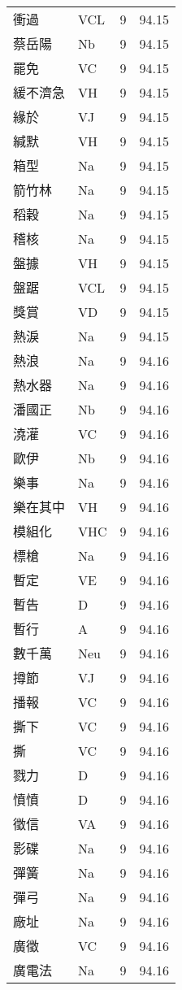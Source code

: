 \documentclass[twocolumn]{book}
\begin{document}
\begin{supertabular}{llrr}
衝過 & VCL & 9 &  94.15\\
蔡岳陽 & Nb & 9 &  94.15\\
罷免 & VC & 9 &  94.15\\
緩不濟急 & VH & 9 &  94.15\\
緣於 & VJ & 9 &  94.15\\
緘默 & VH & 9 &  94.15\\
箱型 & Na & 9 &  94.15\\
箭竹林 & Na & 9 &  94.15\\
稻穀 & Na & 9 &  94.15\\
稽核 & Na & 9 &  94.15\\
盤據 & VH & 9 &  94.15\\
盤踞 & VCL & 9 &  94.15\\
獎賞 & VD & 9 &  94.15\\
熱淚 & Na & 9 &  94.15\\
熱浪 & Na & 9 &  94.16\\
熱水器 & Na & 9 &  94.16\\
潘國正 & Nb & 9 &  94.16\\
澆灌 & VC & 9 &  94.16\\
歐伊 & Nb & 9 &  94.16\\
樂事 & Na & 9 &  94.16\\
樂在其中 & VH & 9 &  94.16\\
模組化 & VHC & 9 &  94.16\\
標槍 & Na & 9 &  94.16\\
暫定 & VE & 9 &  94.16\\
暫告 & D & 9 &  94.16\\
暫行 & A & 9 &  94.16\\
數千萬 & Neu & 9 &  94.16\\
撙節 & VJ & 9 &  94.16\\
播報 & VC & 9 &  94.16\\
撕下 & VC & 9 &  94.16\\
撕 & VC & 9 &  94.16\\
戮力 & D & 9 &  94.16\\
憤憤 & D & 9 &  94.16\\
徵信 & VA & 9 &  94.16\\
影碟 & Na & 9 &  94.16\\
彈簧 & Na & 9 &  94.16\\
彈弓 & Na & 9 &  94.16\\
廠址 & Na & 9 &  94.16\\
廣徵 & VC & 9 &  94.16\\
廣電法 & Na & 9 &  94.16\\

\end{supertabular}
\end{document}
